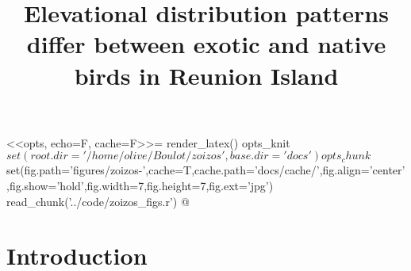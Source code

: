 \documentclass{article}
\title{Elevational distribution patterns differ between exotic and native birds in Reunion Island}
\begin{document}
<<opts, echo=F, cache=F>>=
render_latex()
opts_knit$set(root.dir='/home/olive/Boulot/zoizos',base.dir='docs')
opts_chunk$set(fig.path='figures/zoizos-',cache=T,cache.path='docs/cache/',fig.align='center',fig.show='hold',fig.width=7,fig.height=7,fig.ext='jpg')
read_chunk('../code/zoizos_figs.r')
@ 



\maketitle

\noindent

\begin{abstract}
\end{abstract}


\section{Introduction}
\end{document}
